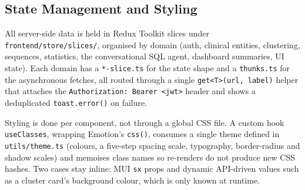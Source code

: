\subsection{State Management and Styling}

All server-side data is held in Redux Toolkit slices under \texttt{frontend/store/slices/}, organised by domain (auth, clinical entities, clustering, sequences, statistics, the conversational SQL agent, dashboard summaries, UI state). Each domain has a \texttt{*-slice.ts} for the state shape and a \texttt{thunks.ts} for the asynchronous fetches, all routed through a single \texttt{get<T>(url, label)} helper that attaches the \texttt{Authorization: Bearer <jwt>} header and shows a deduplicated \texttt{toast.error()} on failure.

Styling is done per component, not through a global CSS file. A custom hook \texttt{useClasses}, wrapping Emotion's \texttt{css()}, consumes a single theme defined in \texttt{utils/theme.ts} (colours, a five-step spacing scale, typography, border-radius and shadow scales) and memoises class names so re-renders do not produce new CSS hashes. Two cases stay inline: MUI \texttt{sx} props and dynamic API-driven values such as a cluster card's background colour, which is only known at runtime.
